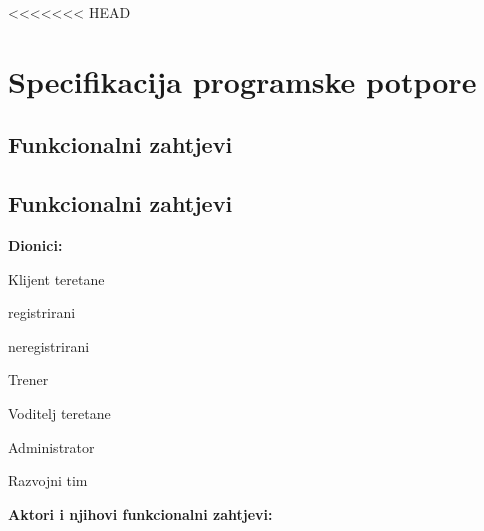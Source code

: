 <<<<<<< HEAD
\chapter{Specifikacija programske potpore}

		
	\section{Funkcionalni zahtjevi}
			
			\section{Funkcionalni zahtjevi}
			
			
			\noindent \textbf{Dionici:}
			
			\begin{packed_enum}
				
				\item Klijent teretane
				\begin{packed_enum}
					
					\item registrirani
					\item neregistrirani
					
				\end{packed_enum}
				\item Trener
				\item Voditelj teretane			
				\item Administrator
				\item Razvojni tim
				
			\end{packed_enum}
			
			\noindent \textbf{Aktori i njihovi funkcionalni zahtjevi:}
			
